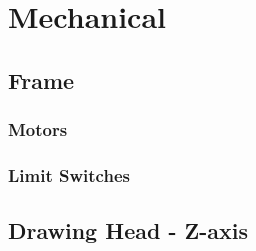 \section{Mechanical}
\label{sec:implementation-mechanical}

	\subsection{Frame}
	
		\subsubsection{Motors}
	
		\subsubsection{Limit Switches}
	
	\subsection{Drawing Head - Z-axis}
	
	